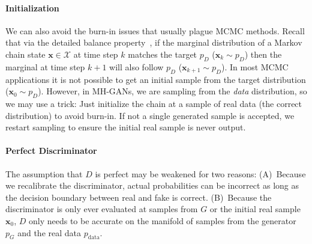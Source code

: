 \documentclass{article}
\renewcommand{\vec}[1]{{\boldsymbol{\mathbf{#1}}}} %
\newcommand{\set}[1]{\mathcal{#1}}
\newcommand{\sample}{\sim}
\newcommand{\PG}{{p_G}}
\newcommand{\PD}{{p_D}}
\newcommand{\PR}{{p_{\textrm{data}}}}
\newcommand{\setx}{\set{X}}
\begin{document}
\paragraph{Initialization}
We can also avoid the burn-in issues that usually plague MCMC methods.
Recall that via the detailed balance property~\citep[Ch.~1]{Gilks1996}, if the marginal distribution of a Markov chain state $\vec x \in \setx$ at time step $k$ matches the target $\PD$ ($\vec x_k \sample \PD$) then the marginal at time step $k+1$ will also follow $\PD$ ($\vec x_{k+1} \sample \PD$)\@.
In most MCMC applications it is not possible to get an initial sample from the target distribution ($\vec x_0 \sample \PD$)\@.
However, in MH-GANs, we are sampling from the \emph{data} distribution, so we may use a trick:
Just initialize the chain at a sample of real data (the correct distribution) to avoid burn-in.
If not a single generated sample is accepted, we restart sampling to ensure the initial real sample is never output.

\paragraph{Perfect Discriminator}
The assumption that $D$ is perfect may be weakened for two reasons:
(A)~Because we recalibrate the discriminator, actual probabilities can be incorrect as long as the decision boundary between real and fake is correct.
(B)~Because the discriminator is only ever evaluated at samples from $G$ or the initial real sample $\vec x_0$, $D$ only needs to be accurate on the manifold of samples from the generator $\PG$ and the real data $\PR$.
\end{document}

